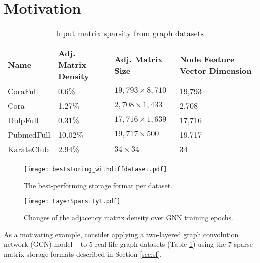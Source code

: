 \vspace{-3mm}
\section{Motivation} \label{moti}
\vspace{-2mm}
\begin{table}[t!]
\caption{Input matrix sparsity from graph datasets}
    \centering
    \scriptsize
    \begin{tabularx}{\textwidth}{XXXX}
    \toprule
    \textbf{Name} & \textbf{Adj. Matrix Density} & \textbf{Adj. Matrix Size} & \textbf{Node Feature Vector Dimension}\\
    \midrule
    \rowcolor{Gray} CoraFull & 0.6\% & $19,793\times8,710$  & 19,793\\
    Cora & 1.27\% & $2,708\times1,433$ & 2,708\\
    \rowcolor{Gray} DblpFull  & 0.31\% & $17,716\times1,639$ & 17,716 \\
    PubmedFull & 10.02\% & $19,717\times500$ & 19,717\\
    \rowcolor{Gray} KarateClub & 2.94\% & $34\times34$ & 34\\
    \bottomrule
    \end{tabularx}
    \label{tab:Dataset_Detail}
    \vspace{-1mm}
\end{table}


\begin{figure}[t!]

\begin{minipage}[t]{0.5\linewidth}
\texttt{[image: beststoring\_withdiffdataset.pdf]}
\caption{The best-performing storage format per dataset.}
\label{fig:beststoring_withdiffdataset}
\vspace{-1mm}
\end{minipage}
\begin{minipage}[t]{0.5\linewidth}
\centering
\texttt{[image: LayerSparsity1.pdf]}
\caption{Changes of the adjacency matrix density over GNN training epochs. }
\label{fig:LayerSparsity}
\end{minipage}
\vspace{-4mm}
\end{figure}

\vspace{-2mm}
As a motivating example, consider applying a
two-layered  graph convolution network (GCN) model ~\cite{kipf2016semi} to 5 real-life graph datasets (Table \ref{tab:Dataset_Detail}) using the 7 sparse matrix storage formats described in Section \ref{sec:sf}.

